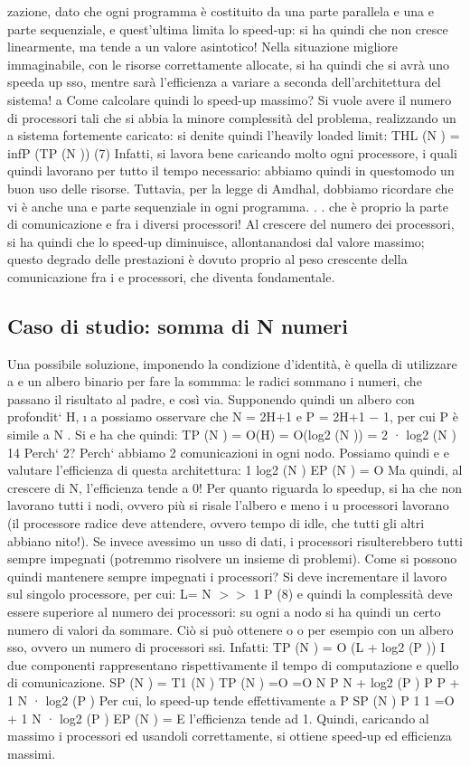 zazione, dato che ogni programma è costituito da una parte parallela e una
e
parte sequenziale, e quest'ultima limita lo speed-up: si ha quindi che non cresce
linearmente, ma tende a un valore asintotico! Nella situazione migliore immaginabile, con le risorse correttamente
allocate, si ha quindi che si avrà uno speeda
up sso, mentre sarà l'efficienza a variare a seconda dell'architettura del sistema!
a
Come calcolare quindi lo speed-up massimo? Si vuole avere il numero di
processori tali che si abbia la minore complessità del problema, realizzando un
a
sistema fortemente caricato: si denite quindi l'heavily loaded limit:
THL (N ) = infP (TP (N ))
(7)
Infatti, si lavora bene caricando molto ogni processore, i quali quindi lavorano
per tutto il tempo necessario: abbiamo quindi in questomodo un buon uso delle
risorse.
Tuttavia, per la legge di Amdhal, dobbiamo ricordare che vi è anche una
e
parte sequenziale in ogni programma. . . che è proprio la parte di comunicazione
e
fra i diversi processori! Al crescere del numero dei processori, si ha quindi
che lo speed-up diminuisce, allontanandosi dal valore massimo; questo degrado
delle prestazioni è dovuto proprio al peso crescente della comunicazione fra i
e
processori, che diventa fondamentale.
\subsection{Caso di studio: somma di N numeri}
Una possibile soluzione, imponendo la condizione d'identità, è quella di utilizzare
a e
un albero binario per fare la sommma: le radici sommano i numeri, che passano
il risultato al padre, e così via. Supponendo quindi un albero con profondit` H,
\i{}
a
possiamo osservare che N = 2H+1 e P = 2H+1 $-$ 1, per cui P è simile a N . Si
e
ha che quindi:
TP (N ) = O(H)
= O(log2 (N ))
= 2 · log2 (N )
14
Perch` 2? Perch` abbiamo 2 comunicazioni in ogni nodo. Possiamo quindi
e
e
valutare l'efficienza di questa architettura:
1
log2 (N )
EP (N ) = O
Ma quindi, al crescere di N, l'efficienza tende a 0! Per quanto riguarda lo speedup, si ha che non lavorano tutti i
nodi,
ovvero più si risale l'albero e meno i
u
processori lavorano (il processore radice deve attendere, ovvero tempo di idle,
che tutti gli altri abbiano nito!). Se invece avessimo un usso di dati, i processori risulterebbero tutti sempre
impegnati (potremmo risolvere un insieme di
problemi).
Come si possono quindi mantenere sempre impegnati i processori? Si deve
incrementare il lavoro sul singolo processore, per cui:
L=
N
$>$$>$ 1
P
(8)
e quindi la complessità deve essere superiore al numero dei processori: su ogni
a
nodo si ha quindi un certo numero di valori da sommare. Ciò si può ottenere
o
o
per esempio con un albero sso, ovvero un numero di processori ssi. Infatti:
TP (N ) = O (L + log2 (P ))
I due componenti rappresentano rispettivamente il tempo di computazione e
quello di comunicazione.
SP (N ) =
T1 (N )
TP (N )
=O
=O
N
P
N
+ log2 (P )
P
P
+
1
N · log2 (P )
Per cui, lo speed-up tende effettivamente a P
SP (N )
P
1
1
=O
+
1 N · log2 (P )
EP (N ) =
E l'efficienza tende ad 1. Quindi, caricando al massimo i processori ed usandoli
correttamente, si ottiene speed-up ed efficienza massimi.
